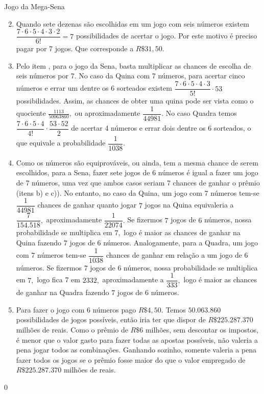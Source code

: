 \begin{answer}{Jogo da Mega-Sena}
{
\begin{enumerate}\setcounter{enumi}{1}

\item Quando sete dezenas são escolhidas em um jogo com seis números existem  $\dfrac{7 \cdot 6 \cdot 5 \cdot 4 \cdot 3 \cdot 2}{6!}=7$ possibilidades de acertar o jogo. Por este motivo é preciso pagar por 7 jogos. Que corresponde a $R\$ 31,50.$

\item Pelo item , para o jogo da Sena, basta multiplicar as chances de escolha de seis números por 7. No caso da Quina com 7 números, para acertar cinco números e errar um dentre os 6 sorteados  existem  $\dfrac{7\cdot 6 \cdot 5 \cdot 4\cdot 3}{5!}\cdot 53$ possibilidades. Assim, as chances de obter uma quina pode ser vista como o quociente $\frac{1113}{50063860},$ ou aproximadamente $\dfrac{1}{44981}.$ 
No caso Quadra temos $\dfrac{7 \cdot 6 \cdot 5 \cdot 4}{4!}\cdot \dfrac{53\cdot 52}{2}$ de acertar 4 números e errar dois dentre os $6$ sorteados, o que equivale a probabilidade $\dfrac{1}{1038}.$

\item Como os números são equiprováveis, ou ainda, tem a mesma chance de serem escolhidos, para a Sena, fazer sete jogos de 6 números é igual a fazer um jogo de 7 números,  uma vez que ambos casos seriam 7 chances de ganhar o prêmio (itens b) e c)). No entanto, no caso da Quina, um jogo com 7 números tem-se $\dfrac{1}{44981}$  chances de ganhar quanto jogar $7$ jogos na Quina equivaleria a $\dfrac{7}{154.518},$  aproximadamente $\dfrac{1}{22074}.$  Se fizermos $7$ jogos de $6$ números, nossa probabilidade se multiplica em $7,$ logo é maior as chances de ganhar na Quina fazendo $7$ jogos de $6$ números.  Analogamente, para a Quadra, um jogo com 7 números tem-se $\dfrac{1}{1038}$ chances de ganhar em relação a um jogo de $6$ números. Se fizermos $7$ jogos de $6$ números, nossa probabilidade se multiplica em $7,$ logo fica 7 em $2332,$ aproximadamente a $\dfrac{1}{333},$ logo  é maior as chances de ganhar na Quadra fazendo $7$ jogos de $6$ números. 

\item Para fazer o jogo com 6 números pago $R\$4,50.$ Temos $50.063.860$ possibilidades de jogos possíveis, então iria ter que dispor de $R\$ 225.287.370$ milhões de reais. Como o prêmio de $R\$ 6$ milhões, sem descontar os impostos, é menor que o valor gasto para fazer todas as apostas possíveis, não valeria a pena jogar todos as combinações. Ganhando sozinho, somente valeria a pena fazer todos os jogos se o prêmio fosse maior do que o valor empregado de  $R\$ 225.287.370$ milhões de reais. 
\end{enumerate}
}{0}
\end{answer}
